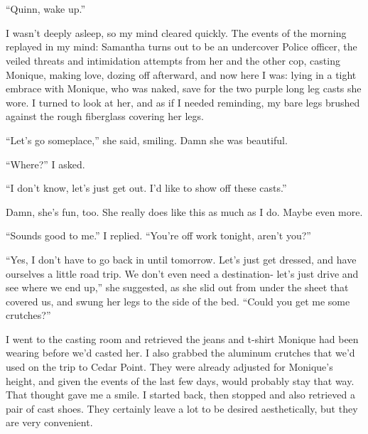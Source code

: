 \chapter{}
``Quinn, wake up.''

I wasn't deeply asleep, so my mind cleared quickly. The events of the morning replayed in
my mind: Samantha turns out to be an undercover Police officer, the veiled threats and
intimidation attempts from her and the other cop, casting Monique, making love, dozing off
afterward, and now here I was: lying in a tight embrace with Monique, who was naked, save for
the two purple long leg casts she wore. I turned to look at her, and as if I needed reminding,
my bare legs brushed against the rough fiberglass covering her legs.

``Let's go someplace,'' she said, smiling. Damn she was beautiful.

``Where?'' I asked.

``I don't know, let's just get out. I'd like to show off these casts.''

Damn, she's fun, too. She really does like this as much as I do. Maybe even more.

``Sounds good to me.'' I replied. ``You're off work tonight, aren't you?''

``Yes, I don't have to go back in until tomorrow. Let's just get dressed, and have ourselves
a little road trip. We don't even need a destination- let's just drive and see where we end
up,''
she suggested, as she slid out from under the sheet that covered us, and swung her legs to the
side of the bed. ``Could you get me some crutches?''

I went to the casting room and retrieved the jeans and t-shirt Monique had been wearing
before we'd casted her. I also grabbed the aluminum crutches that we'd used on the trip to Cedar
Point. They were already adjusted for Monique's height, and given the events of the last few
days, would probably stay that way. That thought gave me a smile. I started back, then stopped
and also retrieved a pair of cast shoes. They certainly leave a lot to be desired aesthetically,
but they are very convenient.

